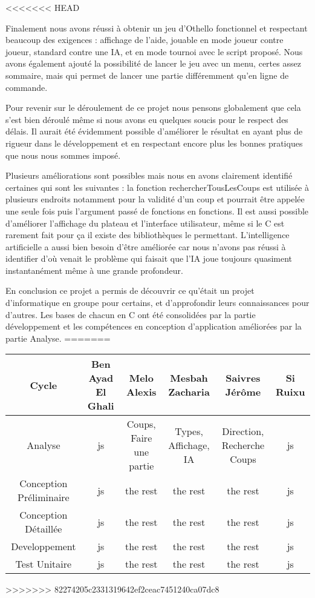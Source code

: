 <<<<<<< HEAD
\hspace{3em}

Finalement nous avons réussi à obtenir un jeu d’Othello fonctionnel et respectant beaucoup des exigences : affichage de l’aide, jouable en mode joueur contre joueur, standard contre une IA, et en mode tournoi avec le script proposé. Nous avons également ajouté la possibilité de lancer le jeu avec un menu, certes assez sommaire, mais qui permet de lancer une partie différemment qu’en ligne de commande.

Pour revenir sur le déroulement de ce projet nous pensons globalement que cela s’est bien déroulé même si nous avons eu quelques soucis pour le respect des délais. Il aurait été évidemment possible d’améliorer le résultat en ayant plus de rigueur dans le développement et en respectant encore plus les bonnes pratiques que nous nous sommes imposé.

Plusieurs améliorations sont possibles mais nous en avons clairement identifié certaines qui sont les suivantes : la fonction rechercherTousLesCoups est utilisée à plusieurs endroits notamment pour la validité d’un coup et pourrait être appelée une seule fois puis l’argument passé de fonctions en fonctions. Il est aussi possible d’améliorer l’affichage du plateau et l’interface utilisateur, même si le C est rarement fait pour ça il existe des bibliothèques le permettant. L’intelligence artificielle a aussi bien besoin d’être améliorée car nous n’avons pas réussi à identifier d’où venait le problème qui faisait que l’IA joue toujours quasiment instantanément même à une grande profondeur.



En conclusion ce projet a permis de découvrir ce qu’était un projet d’informatique en groupe pour certains, et d’approfondir leurs connaissances pour d’autres. Les bases de chacun en C ont été consolidées par la partie développement et les compétences en conception d’application améliorées par la partie Analyse.
=======
\begin{tabular}{|*{6}{c|}}
    \hline
   	Cycle  & Ben Ayad El Ghali  & Melo Alexis  & Mesbah Zacharia  & Saivres Jérôme  & Si Ruixu \\
    \hline
    Analyse  & js  & Coups, Faire une partie  & Types, Affichage, IA  &  Direction, Recherche Coups& js \\
    \hline
   	Conception Préliminaire & js  & the rest  & the rest  & the rest & js \\
    \hline
   	Conception Détaillée & js  & the rest  & the rest  & the rest & js \\
    \hline
   	 Developpement & js  & the rest  & the rest  & the rest & js \\
    \hline
   	 Test Unitaire  &js  & the rest  & the rest  & the rest & js \\
    \hline
\end{tabular}
>>>>>>> 82274205c2331319642ef2ceac7451240ca07dc8
